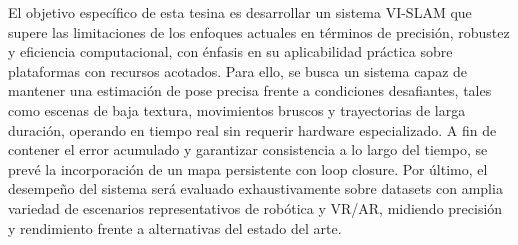 El objetivo específico de esta tesina es desarrollar un sistema VI-SLAM que supere las limitaciones de los enfoques actuales en términos de precisión, robustez y eficiencia computacional, con énfasis en su aplicabilidad práctica sobre plataformas con recursos acotados. Para ello, se busca un sistema capaz de mantener una estimación de pose precisa frente a condiciones desafiantes, tales como escenas de baja textura, movimientos bruscos y trayectorias de larga duración, operando en tiempo real sin requerir hardware especializado. A fin de contener el error acumulado y garantizar consistencia a lo largo del tiempo, se prevé la incorporación de un mapa persistente con loop closure. Por último, el desempeño del sistema será evaluado exhaustivamente sobre datasets con amplia variedad de escenarios representativos de robótica y VR/AR, midiendo precisión y rendimiento frente a alternativas del estado del arte.
